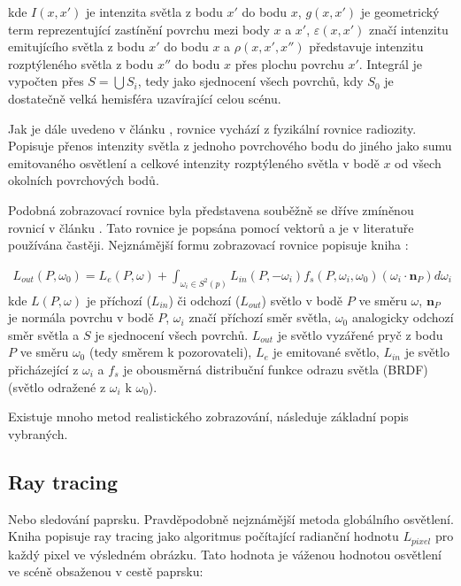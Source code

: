 kde $I(x, x')$ je intenzita světla z bodu $x'$ do bodu $x$, $g(x, x')$ je geometrický term reprezentující zastínění povrchu mezi body $x$ a $x'$, $\varepsilon(x, x')$ značí intenzitu emitujícího světla z bodu $x'$ do bodu $x$ a $\rho(x, x', x'')$ představuje intenzitu rozptýleného světla z bodu $x''$ do bodu $x$ přes plochu povrchu $x'$. Integrál je vypočten přes $S = \bigcup S_i$, tedy jako sjednocení všech povrchů, kdy $S_0$ je dostatečně velká hemisféra uzavírající celou scénu.

Jak je dále uvedeno v článku \cite{render_eq}, rovnice vychází z fyzikální rovnice radiozity. Popisuje přenos intenzity světla z jednoho povrchového bodu do jiného jako sumu emitovaného osvětlení a celkové intenzity rozptýleného světla v bodě $x$ od všech okolních povrchových bodů.

Podobná zobrazovací rovnice byla představena souběžně se dříve zmíněnou rovnicí v článku \cite{render_eq_2}. Tato rovnice je popsána pomocí vektorů a je v literatuře používána častěji. Nejznámější formu zobrazovací rovnice popisuje kniha \cite{gfx_principles_practice}:

\begin{equation} \label{eq:render_2}
	\begin{gathered}
		L_{out}(P, \omega_0) = L_e(P, \omega) + \int_{\omega_i\in S^2(p)}L_{in}(P, -\omega_i)f_s(P, \omega_i, \omega_0)(\omega_i \cdot \textbf{n}_P)d\omega_i
	\end{gathered}
\end{equation}
kde $L(P, \omega)$ je příchozí ($L_{in}$) či odchozí ($L_{out}$) světlo v bodě $P$ ve směru $\omega$, $\textbf{n}_P$ je normála povrchu v bodě $P$, $\omega_i$ značí příchozí směr světla, $\omega_0$ analogicky odchozí směr světla a $S$ je sjednocení všech povrchů. $L_{out}$ je světlo vyzářené pryč z bodu $P$ ve směru $\omega_0$ (tedy směrem k pozorovateli), $L_e$ je emitované světlo, $L_{in}$ je světlo přicházející z $\omega_i$ a $f_s$ je obousměrná distribuční funkce odrazu světla (BRDF)(světlo odražené z $\omega_i$ k $\omega_0$).

Existuje mnoho metod realistického zobrazování, následuje základní popis vybraných.

\subsection{Ray tracing}
Nebo sledování paprsku. Pravděpodobně nejznámější metoda globálního osvětlení. Kniha \cite{advanced_global} popisuje ray tracing jako algoritmus počítající radianční hodnotu $L_{pixel}$ pro každý pixel ve výsledném obrázku. Tato hodnota je váženou hodnotou osvětlení ve scéně obsaženou v cestě paprsku:

